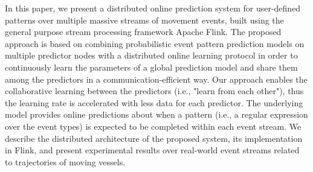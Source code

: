 In this paper, we present a distributed online prediction system for user-defined patterns over multiple massive streams of movement events, built using the general purpose stream processing framework Apache Flink. The proposed approach is based on combining probabilistic event pattern prediction models on multiple predictor nodes with a distributed online learning protocol in order to continuously learn the parameters of a global prediction model and share them among the predictors in a communication-efficient way. Our approach enables the  collaborative learning between the predictors (i.e., "learn from each other"), thus the learning rate is accelerated with less data for each predictor. The underlying model provides online predictions about when a pattern (i.e., a regular expression over the event types) is expected to be completed within each event stream. We describe the distributed architecture of the proposed system, its implementation in Flink, and present experimental results over real-world event streams related to trajectories of moving vessels.

